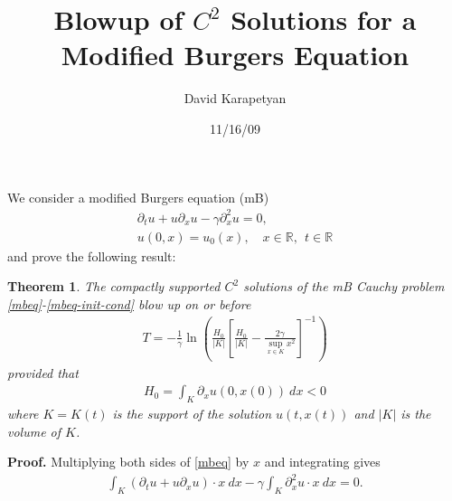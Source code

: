\documentclass[12pt,reqno]{amsart}
\newcommand{\rr}{\mathbb{R}}
\newcommand{\p}{\partial}
\theoremstyle{plain}  %
\newtheorem{theorem}{Theorem}
\begin{document}
\title{Blowup of $C^2$ Solutions for a Modified Burgers Equation }
\author{David Karapetyan}
\address{Department of Mathematics  \\
University  of Notre Dame\\
Notre Dame, IN 46556 }
\date{11/16/09}
%
\maketitle
%
%
\parindent0in
\parskip0.1in
%
%
%
%
\setcounter{equation}{0}
We consider a modified Burgers equation (mB)
%
%
\begin{gather}
	\label{mbeq}
	\p_t u + u \p_x u - \gamma \p_x^2 u = 0,
	\\
	\label{mbeq-init-cond}
	u(0,x) = u_0(x), \quad x \in \rr,  \ \ t \in \rr
\end{gather}
%
%
and prove the following result:
%
%
%
%
%
%
%
%
\begin{theorem}
	\label{thm:main}
	The compactly supported $C^2$ solutions of the mB Cauchy problem
	\eqref{mbeq}-\eqref{mbeq-init-cond} blow up on or
	before
	\begin{equation}
		\label{lifespan}
		\begin{split}
			T = -\frac{1}{\gamma} \ln\left( \frac{H_0}{|K|}\left[
			\frac{H_0}{|K|} - \frac{2\gamma}{\sup_{x \in K} x^2}
			\right]^{-1} \right)
		\end{split}
	\end{equation}
	provided that
	\begin{equation}
		\label{blowup-cond}
		\begin{split}
			H_0 = \int_K \p_x u(0, x(0)) \ dx < 0
		\end{split}
	\end{equation}
	where $K= K(t)$ is the support of the solution $u(t,x(t))$ and $|K|$ is the
	volume of $K$.
\end{theorem}
%
%
{\bf Proof.}
%
%
Multiplying both sides of \eqref{mbeq} by $x$ and integrating gives
%
%
%
%
\begin{equation*}
	\begin{split}
		\int_K (\p_t u + u \p_x u) \cdot x \ dx - \gamma \int_K	\p_x^2 u \cdot 
		x \ dx = 0.
	\end{split}
\end{equation*}
\end{document}
